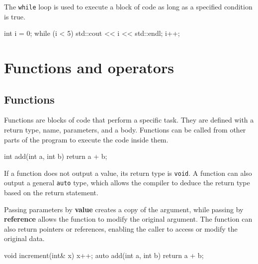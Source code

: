 The \texttt{while} loop is used to execute a block of code as long as a specified condition is true.

\begin{codeblock}[language=C++]
int i = 0;
while (i < 5) {
    std::cout << i << std::endl;
    i++;
}
\end{codeblock}

\section{Functions and operators}

\subsection{Functions}

Functions are blocks of code that perform a specific task. They are defined with a return type, name, parameters, and a body. Functions can be called from other parts of the program to execute the code inside them.

\begin{codeblock}[language=C++, numbers = none]
int add(int a, int b) {
    return a + b;
}
\end{codeblock}

If a function does not output a value, its return type is \texttt{void}.    
A function can also output a general \texttt{auto} type, which allows the compiler to deduce the return type based on the return statement.

Passing parameters by \textbf{value} creates a copy of the argument, while passing by \textbf{reference} allows the function to modify the original argument.
The function can also return pointers or references, enabling the caller to access or modify the original data.

\begin{codeblock}[language=C++, numbers = none]
void increment(int& x) {
    x++;
}
auto add(int a, int b) {
    return a + b;
}
\end{codeblock}

